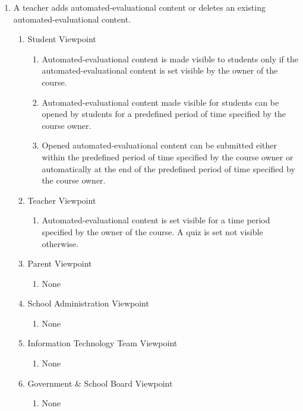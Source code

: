 \documentclass[]{article}
\begin{document}
\begin{enumerate}[{BE}1.]
	\item A teacher adds automated-evaluational content or deletes an existing
automated-evaluational content.
	\begin{enumerate}[{VP2}.1]
		\item Student Viewpoint
			\begin{enumerate}
				\item Automated-evaluational content is made visible to students only if the
automated-evaluational content is set visible by the owner of the course.
				\item Automated-evaluational content made visible for students can be opened
by students for a predefined period of time specified by the course owner.
				\item Opened automated-evaluational content can be submitted either within
the predefined period of time specified by the course owner or automatically at
the end of the predefined period of time specified by the course owner.
			\end{enumerate}
		\item Teacher Viewpoint
			\begin{enumerate}
				\item Automated-evaluational content is set visible for a time period
specified by the owner of the course. A quiz is set not visible otherwise.
			\end{enumerate}
		\item Parent Viewpoint
			\begin{enumerate}
				\item None
			\end{enumerate}
		\item School Administration Viewpoint
			\begin{enumerate}
				\item None
			\end{enumerate}
		\item Information Technology Team Viewpoint
			\begin{enumerate}
				\item None
			\end{enumerate}
		\item Government \& School Board Viewpoint
			\begin{enumerate}
				\item None
			\end{enumerate}
	\end{enumerate}


\end{enumerate}
\end{document}
